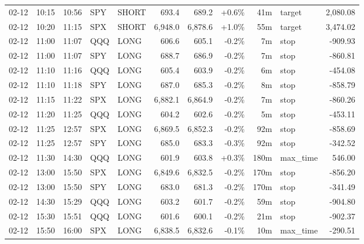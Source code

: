 \documentclass[11pt,a4paper,twoside]{article}
\begin{document}
\begin{center}
\begin{longtable}{>{\color{txtmain}}l l l l l r r r r >{\color{txtmain}}l r}
02-12 & 10:15 & 10:56 & SPY & SHORT & 693.4 & 689.2 & \textcolor{wingreen}{+0.6\%} & 41m & target & \textcolor{wingreen}{2,080.08} \\
02-12 & 10:20 & 11:15 & SPX & SHORT & 6,948.0 & 6,878.6 & \textcolor{wingreen}{+1.0\%} & 55m & target & \textcolor{wingreen}{3,474.02} \\
02-12 & 11:00 & 11:07 & QQQ & LONG & 606.6 & 605.1 & \textcolor{lossred}{-0.2\%} & 7m & stop & \textcolor{lossred}{-909.93} \\
02-12 & 11:00 & 11:07 & SPY & LONG & 688.7 & 686.9 & \textcolor{lossred}{-0.2\%} & 7m & stop & \textcolor{lossred}{-860.81} \\
02-12 & 11:10 & 11:16 & QQQ & LONG & 605.4 & 603.9 & \textcolor{lossred}{-0.2\%} & 6m & stop & \textcolor{lossred}{-454.08} \\
02-12 & 11:10 & 11:18 & SPY & LONG & 687.0 & 685.3 & \textcolor{lossred}{-0.2\%} & 8m & stop & \textcolor{lossred}{-858.79} \\
02-12 & 11:15 & 11:22 & SPX & LONG & 6,882.1 & 6,864.9 & \textcolor{lossred}{-0.2\%} & 7m & stop & \textcolor{lossred}{-860.26} \\
02-12 & 11:20 & 11:25 & QQQ & LONG & 604.2 & 602.6 & \textcolor{lossred}{-0.2\%} & 5m & stop & \textcolor{lossred}{-453.11} \\
02-12 & 11:25 & 12:57 & SPX & LONG & 6,869.5 & 6,852.3 & \textcolor{lossred}{-0.2\%} & 92m & stop & \textcolor{lossred}{-858.69} \\
02-12 & 11:25 & 12:57 & SPY & LONG & 685.0 & 683.3 & \textcolor{lossred}{-0.3\%} & 92m & stop & \textcolor{lossred}{-342.52} \\
02-12 & 11:30 & 14:30 & QQQ & LONG & 601.9 & 603.8 & \textcolor{wingreen}{+0.3\%} & 180m & max\_time & \textcolor{wingreen}{546.00} \\
02-12 & 13:00 & 15:50 & SPX & LONG & 6,849.6 & 6,832.5 & \textcolor{lossred}{-0.2\%} & 170m & stop & \textcolor{lossred}{-856.20} \\
02-12 & 13:00 & 15:50 & SPY & LONG & 683.0 & 681.3 & \textcolor{lossred}{-0.2\%} & 170m & stop & \textcolor{lossred}{-341.49} \\
02-12 & 14:30 & 15:29 & QQQ & LONG & 603.2 & 601.7 & \textcolor{lossred}{-0.2\%} & 59m & stop & \textcolor{lossred}{-904.80} \\
02-12 & 15:30 & 15:51 & QQQ & LONG & 601.6 & 600.1 & \textcolor{lossred}{-0.2\%} & 21m & stop & \textcolor{lossred}{-902.37} \\
02-12 & 15:50 & 16:00 & SPX & LONG & 6,838.5 & 6,832.6 & \textcolor{lossred}{-0.1\%} & 10m & max\_time & \textcolor{lossred}{-290.51} \\

\end{longtable}
\end{center}
\end{document}
